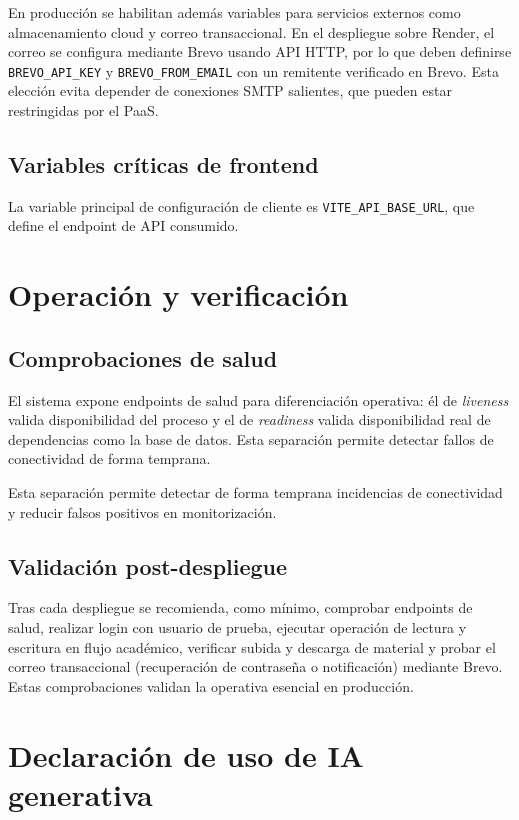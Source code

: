 En producci\'on se habilitan adem\'as variables para servicios externos
como almacenamiento cloud y correo transaccional. En el despliegue sobre
Render, el correo se configura mediante Brevo usando API HTTP, por lo que
deben definirse \texttt{BREVO\_API\_KEY} y \texttt{BREVO\_FROM\_EMAIL}
con un remitente verificado en Brevo. Esta elecci\'on evita depender de
conexiones SMTP salientes, que pueden estar restringidas por el PaaS.

\section{Variables cr\'iticas de frontend}

La variable principal de configuraci\'on de cliente es
\texttt{VITE\_API\_BASE\_URL}, que define el endpoint de API consumido.

\FloatBarrier
\chapter{Operaci\'on y verificaci\'on}\label{apendice-operacion}

\section{Comprobaciones de salud}

El sistema expone endpoints de salud para diferenciaci\'on operativa: \'el de \textit{liveness} valida disponibilidad del proceso y el de \textit{readiness} valida disponibilidad real de dependencias como la base de datos. Esta separaci\'on permite detectar fallos de conectividad de forma temprana.

Esta separaci\'on permite detectar de forma temprana incidencias de conectividad
y reducir falsos positivos en monitorizaci\'on.

\section{Validaci\'on post-despliegue}

Tras cada despliegue se recomienda, como m\'inimo, comprobar endpoints de salud, realizar login con usuario de prueba, ejecutar operaci\'on de lectura y escritura en flujo acad\'emico, verificar subida y descarga de material y probar el correo transaccional (recuperaci\'on de contrase\~na o notificaci\'on) mediante Brevo. Estas comprobaciones validan la operativa esencial en producci\'on.

\FloatBarrier
\chapter{Declaraci\'on de uso de IA generativa}\label{apendice-ia}

